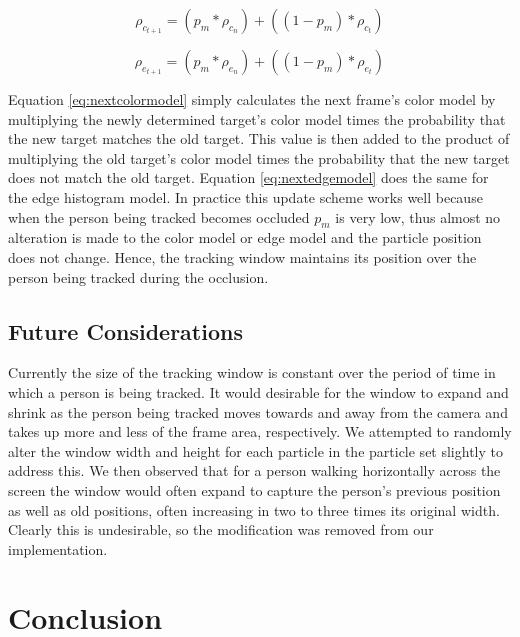 \documentclass[12pt]{article}
\begin{document}
\begin{equation}
\rho_{c_{t+1}} = (p_m * \rho_{c_{n}}) + ((1-p_m) * \rho_{c_{t}})
\label{eq:nextcolormodel}
\end{equation}

\begin{equation}
\rho_{e_{t+1}} = (p_m * \rho_{e_{n}}) + ((1-p_m) * \rho_{e_{t}})
\label{eq:nextedgemodel}
\end{equation}

Equation \ref{eq:nextcolormodel} simply calculates the next frame's color model by multiplying the newly determined target's color model times the probability that the new target matches the old target. This value is then added to the product of multiplying the old target's color model times the probability that the new target does not match the old target. Equation \ref{eq:nextedgemodel} does the same for the edge histogram model. In practice this update scheme works well because when the person being tracked becomes occluded $p_m$ is very low, thus almost no alteration is made to the color model or edge model and the particle position does not change. Hence, the tracking window maintains its position over the person being tracked during the occlusion.  

\subsection{Future Considerations}

Currently the size of the tracking window is constant over the period of time in which a person is being tracked. It would desirable for the window to expand and shrink as the person being tracked moves towards and away from the camera and takes up more and less of the frame area, respectively. We attempted to randomly alter the window width and height for each particle in the particle set slightly to address this. We then observed that for a person walking horizontally across the screen the window would often expand to capture the person's previous position as well as old positions, often increasing in two to three times its original width. Clearly this is undesirable, so the modification was removed from our implementation.


\section{Conclusion}



\newpage
\footnotesize


\end{document}
